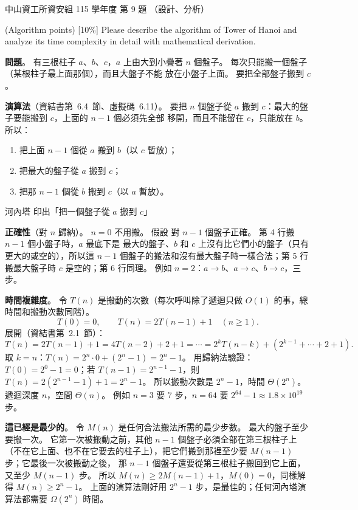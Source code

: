 \begin{pastexam}[label={px:nsysu-115-dmalg-08}]{中山資工所資安組 115 學年度 第 9 題}
（設計、分析）

(Algorithm points) {[}10\%{]} Please describe the algorithm of Tower of Hanoi and analyze its time complexity in detail with mathematical derivation.
\end{pastexam}

\begin{pastsoln}
\textbf{問題}。 有三根柱子 $a$、$b$、$c$，$a$ 上由大到小疊著 $n$ 個盤子。 每次只能搬一個盤子（某根柱子最上面那個），而且大盤子不能
放在小盤子上面。 要把全部盤子搬到 $c$。

\textbf{演算法}（資結書第~6.4~節、虛擬碼~6.11）。 要把 $n$ 個盤子從 $a$ 搬到 $c$：最大的盤子要能搬到 $c$，上面的 $n - 1$ 個必須先全部
移開，而且不能留在 $c$，只能放在 $b$。 所以：
\begin{enumerate}
\item 把上面 $n - 1$ 個從 $a$ 搬到 $b$（以 $c$ 暫放）；
\item 把最大的盤子從 $a$ 搬到 $c$；
\item 把那 $n - 1$ 個從 $b$ 搬到 $c$（以 $a$ 暫放）。
\end{enumerate}
\begin{pseudo}{河內塔}
 
        \State \Return
    \EndIf
    \State {}
    \State 印出「把一個盤子從 $a$ 搬到 $c$」
    \State {}
\EndProcedure
\end{pseudo}
\textbf{正確性}（對 $n$ 歸納）。 $n = 0$ 不用搬。 假設  對 $n - 1$ 個盤子正確。 第 4 行搬 $n - 1$ 個小盤子時，$a$ 最底下是
最大的盤子、$b$ 和 $c$ 上沒有比它們小的盤子（只有更大的或空的），所以這 $n - 1$ 個盤子的搬法和沒有最大盤子時一樣合法；第 5 行
搬最大盤子時 $c$ 是空的；第 6 行同理。 例如 $n = 2$：$a \to b$、$a \to c$、$b \to c$，三步。

\textbf{時間複雜度}。 令 $T(n)$ 是搬動的次數（每次呼叫除了遞迴只做 $O(1)$ 的事，總時間和搬動次數同階）。
\[
T(0) = 0, \qquad T(n) = 2T(n - 1) + 1 \quad (n \ge 1).
\]
展開（資結書第~2.1~節）：
\[
T(n) = 2T(n - 1) + 1 = 4T(n - 2) + 2 + 1 = \cdots = 2^k T(n - k) + (2^{k-1} + \cdots + 2 + 1).
\]
取 $k = n$：$T(n) = 2^n \cdot 0 + (2^n - 1) = 2^n - 1$。 用歸納法驗證：$T(0) = 2^0 - 1 = 0$；若 $T(n - 1) = 2^{n-1} - 1$，則
$T(n) = 2(2^{n-1} - 1) + 1 = 2^n - 1$。 所以搬動次數是 $2^n - 1$，時間 $\Theta(2^n)$。 遞迴深度 $n$，空間 $\Theta(n)$。
例如 $n = 3$ 要 $7$ 步，$n = 64$ 要 $2^{64} - 1 \approx 1.8 \times 10^{19}$ 步。

\textbf{這已經是最少的}。 令 $M(n)$ 是任何合法搬法所需的最少步數。 最大的盤子至少要搬一次。 它第一次被搬動之前，其他 $n - 1$
個盤子必須全部在第三根柱子上（不在它上面、也不在它要去的柱子上），把它們搬到那裡至少要 $M(n - 1)$ 步；它最後一次被搬動之後，
那 $n - 1$ 個盤子還要從第三根柱子搬回到它上面，又至少 $M(n - 1)$ 步。 所以 $M(n) \ge 2M(n - 1) + 1$，$M(0) = 0$，同樣解得
$M(n) \ge 2^n - 1$。 上面的演算法剛好用 $2^n - 1$ 步，是最佳的；任何河內塔演算法都需要 $\Omega(2^n)$ 時間。
\end{pastsoln}
